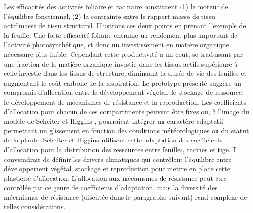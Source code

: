 \documentclass[french]{article}
\begin{document}
{\indent Les efficacités des activités foliaire et racinaire constituent (1) le moteur de l'équilibre fonctionnel, (2) la contrainte entre le rapport masse de tissu actif:masse  de tissu structurel. Illustrons ces deux points en prenant l'exemple de la feuille. Une forte efficacité foliaire entraine un rendement plus important de l'activité photosynthétique, et donc un investissement en matière organique nécessaire plus faible. Cependant cette productivité a un cout, se traduisant par une fraction de la matière organique investie dans les tissus actifs supérieure à celle investie dans les tissus de structure, diminuant la durée de vie des feuilles et augmentant le coût carbone de la respiration.
\indent Le prototype présenté suggère un compromis d'allocation entre le développement végétal, le stockage de ressource, le développement de mécanismes de résistance et la reproduction. Les coefficients d'allocation pour chacun de ces compartiments peuvent être fixes ou, à l'image du modèle de Scheiter et Higgins \cite{Scheiter2009}, pourraient intégrer un caractère adaptatif permettant un glissement en fonction des conditions météorologiques ou du statut de la plante. Scheiter et Higgins utilisent cette adaptation des coefficients d'allocation pour la distribution des ressources entre feuilles, racines et tige. Il conviendrait de définir les drivers climatiques qui contrôlent l'équilibre entre développement végétal, stockage et reproduction pour mettre en place cette plasticité d'allocation. L'allocation aux mécanismes de résistance peut être contrôlée par ce genre de coefficients d'adaptation, mais la diversité des mécanismes de résistance (discutée dans le paragraphe suivant) rend complexe de telles considérations.

}
\end{document}
